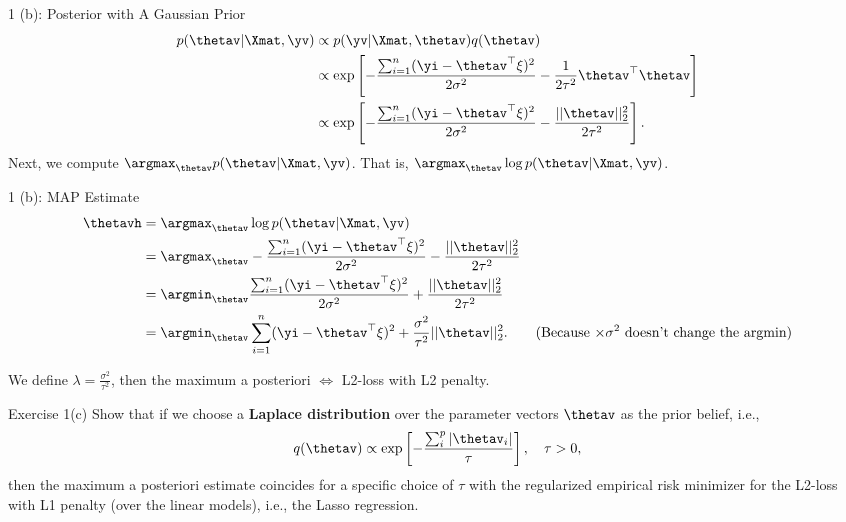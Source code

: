 \documentclass[aspectratio=169]{beamer}
\newcommand{\sumip}{\sum_i^p}
\newcommand{\thetai}{\thetav_i}
\begin{document}
\begin{frame}{1 (b): Posterior with A Gaussian Prior}
\begin{equation*}
	\begin{aligned}
		p(\thetav | \Xmat, \yv) &\propto p(\yv | \Xmat, \thetav) q(\thetav) \\
		&\propto \exp \left[-\frac{\sum_{i=1}^n(\yi - \thetav^\top \xi)^2}{2\sigma^2}- \frac{1}{2 \tau^2} \thetav^\top \thetav \right] \\
		&\propto \exp \left[-\frac{\sum_{i=1}^n(\yi - \thetav^\top \xi)^2}{2\sigma^2} - \frac{||\thetav||_2^2}{2 \tau^2} \right].
	\end{aligned}
\end{equation*}
Next, we compute $\argmax_{\thetav} p(\thetav | \Xmat, \yv)$. That is, $\argmax_{\thetav} \log p(\thetav | \Xmat, \yv)$.
\end{frame}

\begin{frame}{1 (b): MAP Estimate}
\begin{equation*}
	\begin{aligned}
		\thetavh &= \argmax_{\thetav} \log p(\thetav | \Xmat, \yv) \\
		&= \argmax_{\thetav} -\frac{\sum_{i=1}^n(\yi - \thetav^\top \xi)^2}{2\sigma^2} - \frac{||\thetav||_2^2}{2 \tau^2} \\
		&= \argmin_{\thetav} \frac{\sum_{i=1}^n(\yi - \thetav^\top \xi)^2}{2\sigma^2} + \frac{||\thetav||_2^2}{2 \tau^2} \\
		&= \argmin_{\thetav} \sum_{i=1}^n(\yi - \thetav^\top \xi)^2 + \frac{\sigma^2}{\tau^2} ||\thetav||_2^2. \qquad \text{(Because $\times \sigma^2$ doesn't change the argmin)}
	\end{aligned}
\end{equation*}

We define $\lambda = \frac{\sigma^2}{\tau^2}$, then the maximum a posteriori $\Leftrightarrow$ L2-loss with L2 penalty.
	
\end{frame}

\begin{frame}{Exercise 1(c)}
	Show that if we choose a \textbf{Laplace distribution} over the parameter vectors $\thetav$ as the prior belief, i.e., 
	\begin{equation*}
		q(\thetav) \propto \exp \left[ - \frac{\sumip |\thetai|}{\tau} \right], \quad \tau > 0,
	\end{equation*}
	then the maximum a posteriori estimate coincides for a specific choice of $\tau$ with the regularized empirical risk minimizer for the L2-loss with L1 penalty (over the linear models), i.e., the Lasso regression.
\end{frame}
\end{document}
